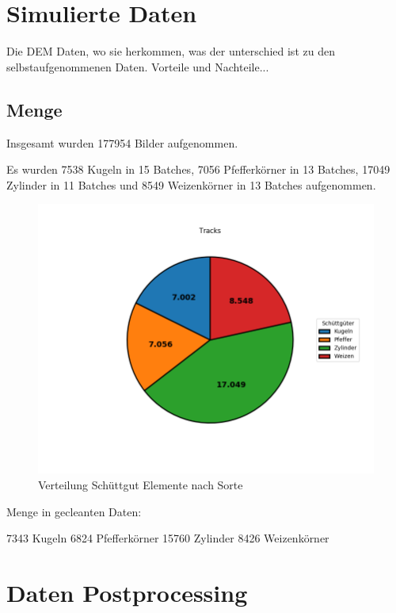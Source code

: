 \section{Simulierte Daten}

Die DEM Daten, wo sie herkommen, was der unterschied ist zu den selbstaufgenommenen Daten. Vorteile und Nachteile...

\subsection{Menge}

Insgesamt wurden 177954 Bilder aufgenommen.

Es wurden 
7538 Kugeln in 15 Batches,
7056 Pfefferkörner in 13 Batches,
17049 Zylinder in 11 Batches
und 8549 Weizenkörner in 13 Batches aufgenommen.


\begin{figure}
    \centering
    \includegraphics[width=\textwidth]{img/scaledPieChart-trimmed}
    \caption{Verteilung Schüttgut Elemente nach Sorte}
    \label{piechartSchuettgut}
\end{figure}


Menge in gecleanten Daten:

7343 Kugeln
6824 Pfefferkörner
15760 Zylinder
8426 Weizenkörner


\section{Daten Postprocessing}

